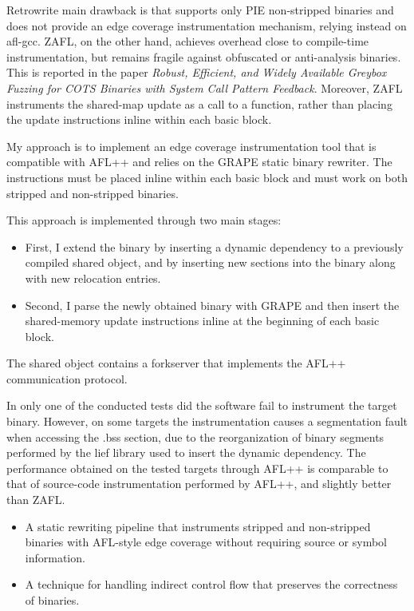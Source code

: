 \documentclass{report}
\begin{document}
    Retrowrite main drawback is that supports only PIE non-stripped binaries and does not provide an edge coverage instrumentation mechanism, relying instead on afl-gcc.
    ZAFL, on the other hand, achieves overhead close to compile-time instrumentation, but remains fragile against obfuscated or anti-analysis binaries.
    This is reported in the paper \textit{Robust, Efficient, and Widely Available Greybox Fuzzing for COTS Binaries with System Call Pattern Feedback}.
    Moreover, ZAFL instruments the shared-map update as a call to a function, rather than placing the update instructions inline within each basic block.

    My approach is to implement an edge coverage instrumentation tool that is compatible with AFL++ and relies on the GRAPE static binary rewriter.
    The instructions must be placed inline within each basic block and must work on both stripped and non-stripped binaries.

    This approach is implemented through two main stages:
    \begin{itemize}
        \item First, I extend the binary by inserting a dynamic dependency to a previously compiled shared object, and by inserting new sections into the binary along with new relocation entries.
        \item Second, I parse the newly obtained binary with GRAPE and then insert the shared-memory update instructions inline at the beginning of each basic block.
    \end{itemize}
    The shared object contains a forkserver that implements the AFL++ communication protocol.

    In only one of the conducted tests did the software fail to instrument the target binary. However, on some targets the instrumentation causes a segmentation fault when accessing the .bss section, due to the reorganization of binary segments performed by the lief library used to insert the dynamic dependency. The performance obtained on the tested targets through AFL++ is comparable to that of source-code instrumentation performed by AFL++, and slightly better than ZAFL.
             
    \begin{itemize}
        \item A static rewriting pipeline that instruments stripped and non-stripped binaries with AFL-style edge coverage without requiring source or symbol information.
        \item A technique for handling indirect control flow that preserves the correctness of binaries.
\end{itemize}
    
\end{document}
